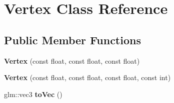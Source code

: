 \hypertarget{class_vertex}{\section{Vertex Class Reference}
\label{class_vertex}
}
\subsection*{Public Member Functions}
\begin{DoxyCompactItemize}
\item 
\hypertarget{class_vertex_aefe676f25534f068f0db79657a2a1f1f}{{\bfseries Vertex} (const float, const float, const float)}\label{class_vertex_aefe676f25534f068f0db79657a2a1f1f}

\item 
\hypertarget{class_vertex_a34135c408fda6b140d0737f584b10ac7}{{\bfseries Vertex} (const float, const float, const float, const int)}\label{class_vertex_a34135c408fda6b140d0737f584b10ac7}

\item 
\hypertarget{class_vertex_ad2058f2e0cd5c89032b5a364d94cce08}{glm\-::vec3 {\bfseries to\-Vec} ()}\label{class_vertex_ad2058f2e0cd5c89032b5a364d94cce08}

\end{DoxyCompactItemize}
